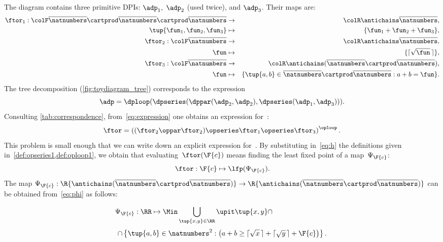 The diagram contains three primitive DPIs: $\adp_{1},$ $\adp_{2}$ (used twice), and $\adp_{3}$.
Their \ftor maps are:
\begin{eqnarray*}
    \ftor_{1}:{\colF\overline{\natnumbers}\cartprod\overline{\natnumbers}\cartprod\overline{\natnumbers}} & \rightarrow & {\colR\antichains\overline{\natnumbers}},\\
    \tup{ \fun_{1},\fun_{2},\fun_{3}}  & \mapsto & \{\fun_{1}+\fun_{2}+\fun_{3}\},\\
    \ftor_{2}:{\colF\overline{\natnumbers}} & \rightarrow & {\colR\antichains\overline{\natnumbers}},\\
    \fun& \mapsto & \{\lceil\sqrt{\fun}\,\rceil\},\\
    \ftor_{3}:{\colF\overline{\natnumbers}} & \rightarrow & {\colR\antichains(\overline{\natnumbers}\cartprod\overline{\natnumbers})},\\
    \fun& \mapsto & \{\tup{ a,b} \in\overline{\natnumbers}\cartprod\overline{\natnumbers}:a+b=\fun\}.
\end{eqnarray*}
The tree decomposition (\cref{fig:toydiagram_tree}) corresponds to the expression
\begin{equation}
    \adp=\dploop(\dpseries(\dppar(\adp_{2},\adp_{2}),\dpseries(\adp_{1},\adp_{3}))).\label{eq:expression}
\end{equation}
Consulting \cref{tab:correspondence}, from~\cref{eq:expression} one obtains an expression for~\ftor:
\begin{equation}
    \ftor=\left((\ftor_{2}\oppar\ftor_{2})\opseries\ftor_{1}\opseries\ftor_{3}\right)^{\oploop}.\label{eq:h}
\end{equation}
This problem is small enough that we can write down an explicit expression for~\ftor.
By substituting in~\cref{eq:h} the definitions given in~\cref{def:opseries1,def:oploop1}, we obtain that evaluating~$\ftor(\F{c})$ means finding the least fixed point of a map~$\Psi_{\F{c}}$:
\begin{equation*}
    \ftor:\F{c}\mapsto\lfp(\Psi_{\F{c}}).
\end{equation*}
The map $\Psi_{\F{c}}:\R{\antichains(\overline{\natnumbers}\cartprod\overline{\natnumbers})}\rightarrow\R{\antichains(\overline{\natnumbers}\cartprod\overline{\natnumbers})}$ can be obtained from~\cref{eq:phi} as follows:

\begin{equation}
    \Psi_{\F{c}}:\RR\mapsto\Min\bigcup_{\tup{ x,y} \in\RR}\upit\tup{ x,y} \cap\qquad\qquad\qquad\qquad
\end{equation}
%
\begin{equation}
    \cap\left\{ \tup{ a,b} \in\natnumbers^{2}:\left(a+b\geq\lceil\sqrt{x}\,\rceil+\lceil\sqrt{y}\,\rceil+\F{c}\right)\right\}.
\end{equation}
%

